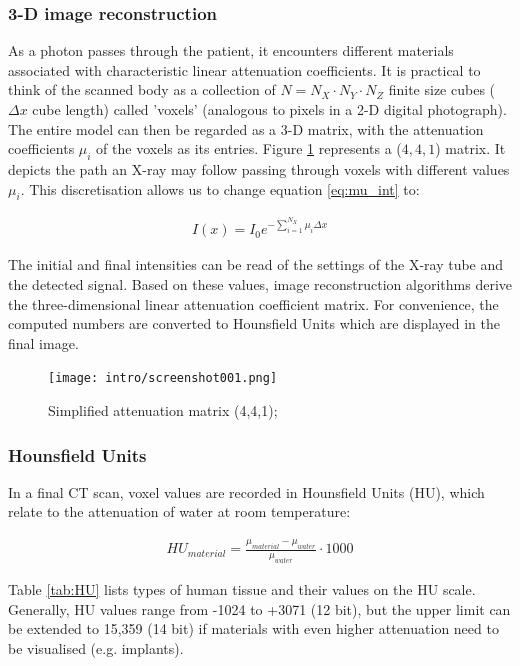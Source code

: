\subsubsection{3-D image reconstruction}
As a photon passes through the patient, it encounters different materials associated with characteristic linear attenuation coefficients.
It is practical to think of the scanned body as a collection of $N = N_X\cdot N_Y\cdot N_Z$ finite size cubes ($\Delta x$ cube length) called 'voxels' (analogous to pixels in a 2-D digital photograph).
The entire model can then be regarded as a 3-D matrix, with the attenuation coefficients $\mu_i$ of the voxels as its entries.
Figure \ref{fig:voxel_matrix} represents a ($4, 4, 1$) matrix.
It depicts the path an X-ray may follow passing through voxels with different values $\mu_i$.
This discretisation allows us to change equation \ref{eq:mu_int} to:

\begin{align}
\label{eq:mu_sum}
I(x) = I_0 e^{- \sum\limits_{i=1}^{N_X} \mu_i \Delta x}
\end{align}

The initial and final intensities can be read of the settings of the X-ray tube and the detected signal.
Based on these values, image reconstruction algorithms derive the three-dimensional linear attenuation coefficient matrix.
For convenience, the computed numbers are converted to Hounsfield Units which are displayed in the final image. \cite{Podgorsak, Maidment2014}

\begin{figure}[!htb]
	\centering
	\texttt{[image: intro/screenshot001.png]}
	\caption{Simplified attenuation matrix (4,4,1); \cite{Maidment2014}}
	\label{fig:voxel_matrix}
\end{figure}

\subsubsection{Hounsfield Units}

In a final CT scan, voxel values are recorded in Hounsfield Units (HU), which relate to the attenuation of water at room temperature:

\begin{align}
HU_{material} = \frac{\mu_{material} - \mu_{water}}{\mu_{water}} \cdot 1000
\end{align}

Table \ref{tab:HU} lists types of human tissue and their values on the HU scale.
Generally, HU values range from -1024 to +3071 (12 bit), but the upper limit can be extended to 15,359 (14 bit) if materials with even higher attenuation need to be visualised (e.g. implants). \\

